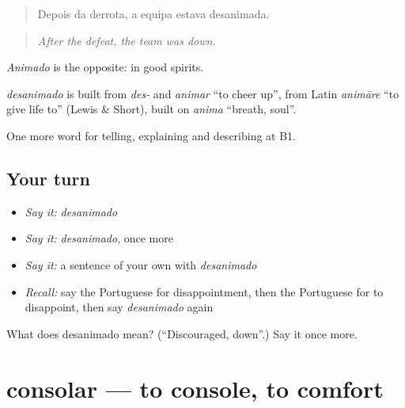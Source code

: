 \begin{quote}
Depois da derrota, a equipa estava desanimada.
\end{quote}

\begin{quote}
\emph{After the defeat, the team was down.}
\end{quote}

\emph{Animado} is the opposite: in good spirits.

\begin{cousinweb}
\emph{desanimado} is built from \emph{des-} and \emph{animar} \textquotedblleft{}to cheer up\textquotedblright{}, from Latin \emph{animāre} \textquotedblleft{}to give life to\textquotedblright{} (Lewis \& Short), built on \emph{anima} \textquotedblleft{}breath, soul\textquotedblright{}.
\end{cousinweb}

\begin{grammarlens}[title={What you've built}]
One more word for telling, explaining and describing at B1.
\end{grammarlens}

\subsection*{Your turn}
\begin{itemize}
\raggedright
  \item \emph{Say it:} \emph{desanimado}
  \item \emph{Say it:} \emph{desanimado}, once more
  \item \emph{Say it:} a sentence of your own with \emph{desanimado}
  \item \emph{Recall:} say the Portuguese for disappointment, then the Portuguese for to disappoint, then say \emph{desanimado} again
\end{itemize}

\begin{tcolorbox}[breakable,colback=teal!4,colframe=teal!35!black,title={Before you move on}]
What does desanimado mean? (\textquotedblleft{}Discouraged, down\textquotedblright{}.) Say it once more.
\end{tcolorbox}
\section[consolar]{consolar — to console, to comfort}

\label{lesson:PT-C476-consolar}



